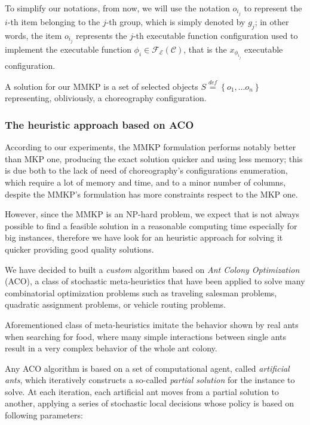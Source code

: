 \documentclass[12pt,a4paper]{report}
\newcommand{\mathDef}{\overset{\textit{def}}{=}}
\begin{document}
To simplify our notations, from now, we will use the notation $o_{i_j}$ to represent the $i$-th item belonging to the $j$-th group, which is simply denoted by $g_j$; in other words, the item $o_{i_j}$ represents the $j$-th executable function configuration used to implement the executable function $\phi_i \in \mathscr{F_E}(\mathcal{C})$, that is the $x_{\phi_{i_j}}$ executable configuration.

A solution for our MMKP is a set of selected objects $S \mathDef \left\{o_{1}, \ldots o_{n} \right\}$ representing, obliviously, a choreography configuration.

\subsubsection{The heuristic approach based on ACO}

According to our experiments, the MMKP formulation performs notably better than MKP one, producing the exact solution quicker and using less memory; this is due both to the lack of need of choreography's configurations enumeration, which require a lot of memory and time, and to a minor number of columns, despite the MMKP's formulation has more constraints respect to the MKP one.

However, since the MMKP is an NP-hard problem, we expect that is not always possible to find a feasible solution in a reasonable computing time especially for big instances, therefore we have look for an heuristic approach for solving it quicker providing good quality solutions.

We have decided to built a \textit{custom} algorithm based on \textit{Ant Colony Optimization} (ACO), a class of stochastic meta-heuristics that have been applied to solve many combinatorial optimization problems such as traveling salesman problems, quadratic assignment problems, or vehicle routing problems.

Aforementioned class of meta-heuristics imitate the behavior shown by real ants when searching for food, where many simple interactions between single ants result in a very complex behavior of the whole ant colony.

Any ACO algorithm is based on a set of computational agent, called \textit{artificial ants}, which iteratively constructs a so-called  \textit{partial solution} for the instance to solve. At each iteration, each artificial ant moves from a partial solution to another, applying a series of stochastic local decisions whose policy is based on following parameters:
\end{document}
